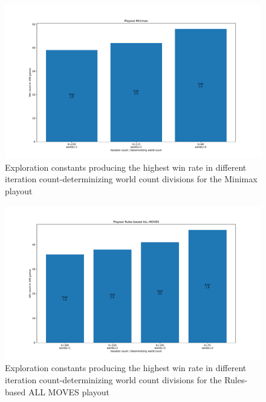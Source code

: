 \begin{figure}[H]
    \caption{Exploration constants producing the highest win rate in different iteration count-determinizing world count divisions for the Minimax playout}
    \centerline{\mbox{\includegraphics[width=170mm]{img/mcts_expl_worldcount_Minimax.pdf}}}
    \label{fig:example}
\end{figure}


\begin{figure}[H]
    \caption{Exploration constants producing the highest win rate in different iteration count-determinizing world count divisions for the Rules-based ALL MOVES playout}
    \centerline{\mbox{\includegraphics[width=170mm]{img/mcts_expl_worldcount_Rules-based ALL MOVES.pdf}}}
    \label{fig:example}
\end{figure}

